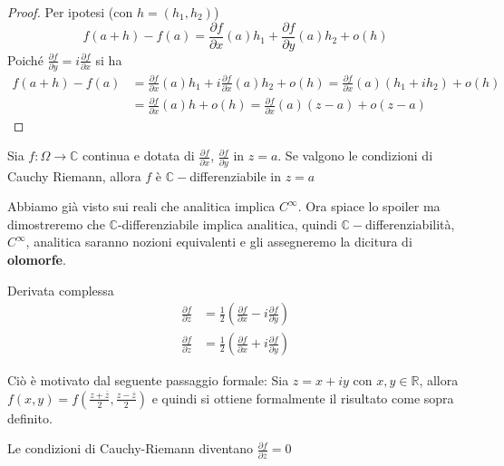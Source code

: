 \begin{proof}
    Per ipotesi (con \(h = (h_{1}, h_{2})\))
    \[
        f(a + h) - f(a) = \frac{\partial f}{\partial x}(a) h_{1} +
        \frac{\partial f}{\partial y}(a) h_{2} + o(h)
    \]
    Poiché \(\frac{\partial f}{\partial y} = i \frac{\partial f}{\partial x}\)
    si ha 
    \begin{align*}
        f(a+h)  - f(a) &= \frac{\partial f}{\partial x}(a) h_{1} +
        i\frac{\partial f}{\partial x}(a) h_{2} + o(h) = \frac{\partial
    f}{\partial x}(a) (h_{1} + ih_{2}) + o(h) \\
        &= \frac{\partial f}{\partial x} (a) h + o(h) = \frac{\partial
        f}{\partial x} (a) (z-a) + o(z-a)
    \end{align*}
\end{proof}
\begin{theorem}
    Sia \(f : \Omega \to \mathbb{C}\) continua e dotata di \(\frac{\partial
    f}{\partial x}\), \(\frac{\partial f}{\partial y}\) in \(z=a\). Se valgono
    le condizioni di Cauchy Riemann, allora \(f\) è
    \(\mathbb{C}-\)differenziabile in \(z=a\) 
\end{theorem}
Abbiamo già visto sui reali che analitica implica \(C^{\infty}\). Ora spiace lo
spoiler ma dimostreremo che \(\mathbb{C}\)-differenziabile implica analitica,
quindi \(\mathbb{C}-\)differenziabilità, \(C^{\infty}\), analitica saranno
nozioni equivalenti e gli assegneremo la dicitura di \textbf{olomorfe}.

\begin{definition}{Derivata complessa}
    \begin{align*}
        \frac{\partial f}{\partial z} &= \frac{1}{2} {\left( \frac{\partial
        f}{\partial x} - i \frac{\partial f}{\partial y} \right)} \\
                    \frac{\partial f}{\partial \overline{z}} &= \frac{1}{2}
                    {\left( \frac{\partial f}{\partial x} + i \frac{\partial
                    f}{\partial y} \right)}
    \end{align*}
\end{definition}
Ciò è motivato dal seguente passaggio formale: Sia \(z = x+iy\) con \(x,y \in
\mathbb{R}\), allora \(f(x,y) = f{\left( \frac{z+\overline{z}}{2},
\frac{z-\overline{z}}{2} \right)} \) e quindi si ottiene formalmente il
risultato come sopra definito.
\begin{remark}
    Le condizioni di Cauchy-Riemann diventano
    \( \displaystyle
        \frac{\partial f}{\partial \overline{z}} = 0
    \)
\end{remark}

